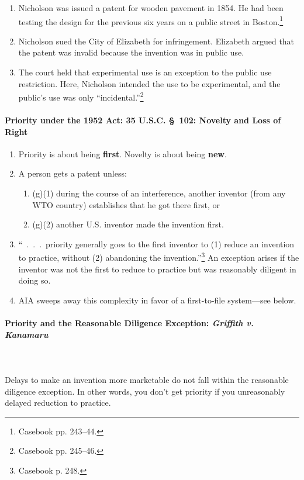 \begin{enumerate}
    \item Nicholson was issued a patent for wooden pavement in 1854. He had been 
    testing the design for the previous six years on a public street in 
    Boston.\footnote{Casebook pp. 243--44.}
    \item Nicholson sued the City of Elizabeth for infringement. Elizabeth 
    argued that the patent was invalid because the invention was in public use.
    \item The court held that experimental use is an exception to the public use 
    restriction. Here, Nicholson intended the use to be experimental, and the 
    public's use was only ``incidental.''\footnote{Casebook pp. 245--46.}
\end{enumerate}

\paragraph{Priority under the 1952 Act: 35 U.S.C. \S\ 102: Novelty and Loss of 
Right}

\begin{enumerate}
    \item Priority is about being \textbf{first}. Novelty is about being 
    \textbf{new}.
    \item A person gets a patent unless:
    \begin{enumerate}
        \item (g)(1) during the course of an interference, another inventor (from 
        any WTO country) establishes that he got there first, or
        \item (g)(2) another U.S. inventor made the invention first.
    \end{enumerate}
    \item ``~.~.~.~priority generally goes to the first inventor to (1) reduce 
    an invention to practice, without (2) abandoning the 
    invention.''\footnote{Casebook p. 248.} An exception arises if the inventor 
    was not the first to reduce to practice but was reasonably diligent in doing 
    so.
    \item AIA sweeps away this complexity in favor of a first-to-file 
    system---see below. 
\end{enumerate}

\paragraph{Priority and the Reasonable Diligence Exception: \emph{Griffith v. 
Kanamaru}}
~\\\\
Delays to make an invention more marketable do not fall within the reasonable 
diligence exception. In other words, you don't get priority if you 
unreasonably delayed reduction to practice.

